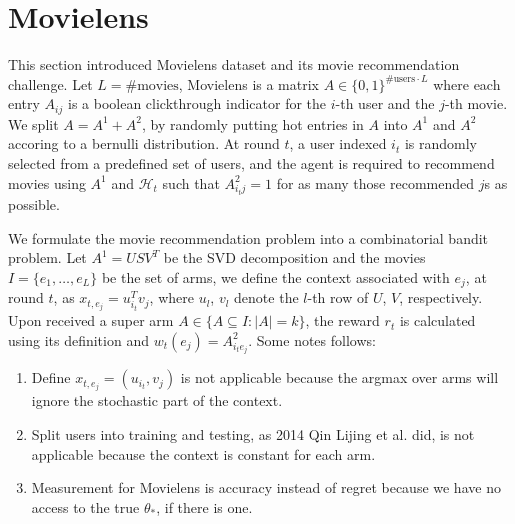 \documentclass[a4paper,11pt]{article}
\begin{document}
\section{Movielens}

This section introduced Movielens dataset and its movie recommendation challenge. Let $L=\#\text{movies}$, Movielens is a matrix $A\in \{0,1\}^{\#\text{users}\cdot L}$ where each entry $A_{ij}$ is a boolean clickthrough indicator for the $i$-th user and the $j$-th movie. We split $A=A^1+A^2$, by randomly putting hot entries in $A$ into $A^1$ and $A^2$ accoring to a bernulli distribution. At round $t$, a user indexed $i_t$ is randomly selected from a predefined set of users, and the agent is required to recommend movies using $A^1$ and $\mathcal{H}_t$ such that $A^2_{i_tj}=1$ for as many those recommended $j$s as possible.

We formulate the movie recommendation problem into a combinatorial bandit problem. Let $A^1=USV^T$ be the SVD decomposition and the movies $I=\{e_1,\dots,e_L\}$ be the set of arms, we define the context associated with $e_j$, at round $t$, as $x_{t,e_j}=u_{i_t}^Tv_j$, where $u_l$, $v_l$ denote the $l$-th row of $U$, $V$, respectively. Upon received a super arm $A\in \{A\subseteq I: |A|=k\}$, the reward $r_t$ is calculated using its definition and $w_t(e_j)=A^2_{i_te_j}$. Some notes follows:

\begin{enumerate}

  \item Define $x_{t,e_j}=(u_{i_t}, v_j)$ is not applicable because the argmax over arms will ignore the stochastic part of the context.

  \item Split users into training and testing, as 2014 Qin Lijing et al. did, is not applicable because the context is constant for each arm.

  \item Measurement for Movielens is accuracy instead of regret because we have no access to the true $\theta_\ast$, if there is one.

\end{enumerate}
\end{document}
